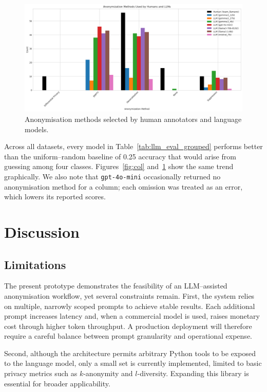 \documentclass{article}
\begin{document}
\begin{figure}[!htbp]
    \centering
    \includegraphics[width=\linewidth]{images/plot_eval.png}
    \caption{Anonymisation methods selected by human annotators and language models.}
    \label{fig:anonymization}
\end{figure}


Across all datasets, every model in Table~\ref{tab:llm_eval_grouped} performs better than the uniform–random baseline of 0.25 accuracy that would arise from guessing among four classes.  Figures~\ref{fig:col} and~\ref{fig:anonymization} show the same trend graphically.  We also note that \texttt{gpt-4o-mini} occasionally returned no anonymisation method for a column; each omission was treated as an error, which lowers its reported scores.


\section{Discussion}
\subsection{Limitations}
\label{sec:limitations}

The present prototype demonstrates the feasibility of an LLM–assisted anonymisation workflow, yet several constraints remain.  
First, the system relies on multiple, narrowly scoped prompts to achieve stable results.  Each additional prompt increases latency and, when a commercial model is used, raises monetary cost through higher token throughput.  A production deployment will therefore require a careful balance between prompt granularity and operational expense.  

Second, although the architecture permits arbitrary Python tools to be exposed to the language model, only a small set is currently implemented, limited to basic privacy metrics such as $k$-anonymity and $l$-diversity.  Expanding this library is essential for broader applicability.  
\end{document}
